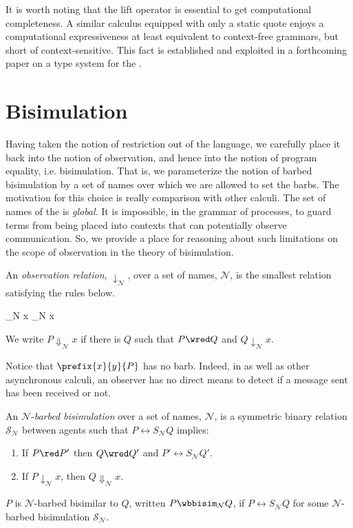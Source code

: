 It is worth noting that the lift operator is essential to get
computational completeness. A similar calculus equipped with only a
static quote enjoys a computational expressiveness at least equivalent
to context-free grammars, but short of context-sensitive. This fact is
established and exploited in a forthcoming paper on a type system for
the {\rhoc}.

\section{Bisimulation}

Having taken the notion of restriction out of the language, we
carefully place it back into the notion of observation, and hence into
the notion of program equality, i.e. bisimulation. That is, we
parameterize the notion of barbed bisimulation by a set of names over
which we are allowed to set the barbs. The motivation for this choice
is really comparison with other calculi. The set of names of the
{\rhoc} is \textit{global}. It is impossible, in the grammar of
processes, to guard terms from being placed into contexts that can
potentially observe communication. So, we provide a place for
reasoning about such limitations on the scope of observation in the
theory of bisimulation.

\begin{definition}
An \emph{observation relation}, $\downarrow_{\mathcal N}$, over a set
of names, $\mathcal N$, is the smallest relation satisfying the rules
below.

		  { \downarrow_{\mathcal N} x}
		  { \downarrow_{\mathcal N} x}

We write $P \Downarrow_{\mathcal N} x$ if there is $Q$ such that 
$P \wred Q$ and $Q \downarrow_{\mathcal N} x$.
\end{definition}

Notice that $\prefix{x}{y}{P}$ has no barb.  Indeed, in {\rhoc} as well
as other asynchronous calculi, an observer has no direct means to
detect if a message sent has been received or not.

\begin{definition}
An  ${\mathcal N}$-\emph{barbed bisimulation} over a set of names, ${\mathcal N}$, is a symmetric binary relation 
${\mathcal S}_{\mathcal N}$ between agents such that $P\rel{S}_{\mathcal N}Q$ implies:
\begin{enumerate}
\item If $P \red P'$ then $Q \wred Q'$ and $P'\rel{S}_{\mathcal N} Q'$.
\item If $P\downarrow_{\mathcal N} x$, then $Q\Downarrow_{\mathcal N} x$.
\end{enumerate}
$P$ is ${\mathcal N}$-barbed bisimilar to $Q$, written
$P \wbbisim_{\mathcal N} Q$, if $P \rel{S}_{\mathcal N} Q$ for some ${\mathcal N}$-barbed bisimulation ${\mathcal S}_{\mathcal N}$.
\end{definition}

